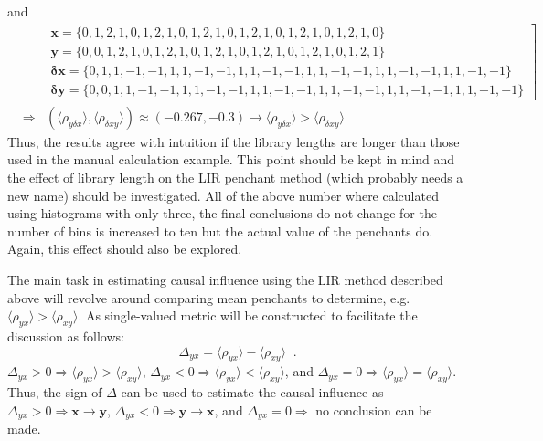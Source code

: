 \documentclass[a4paper,11pt]{article}
\begin{document}
and 
\begin{eqnarray}
& &\left.
\begin{array}{c}
\mathbf{x} = \{0,1,2,1,0,1,2,1,0,1,2,1,0,1,2,1,0,1,2,1,0,1,2,1,0\}\\
\mathbf{y} = \{0,0,1,2,1,0,1,2,1,0,1,2,1,0,1,2,1,0,1,2,1,0,1,2,1\}\\
\mathbf{\delta x} = \{0,1,1,-1,-1,1,1,-1,-1,1,1,-1,-1,1,1,-1,-1,1,1,-1,-1,1,1,-1,-1\}\\
\mathbf{\delta y} = \{0,0,1,1,-1,-1,1,1,-1,-1,1,1,-1,-1,1,1,-1,-1,1,1,-1,-1,1,1,-1,-1\}
\end{array}
\right] \\
&\Rightarrow& \left(\langle \rho_{y\delta x}\rangle, \langle \rho_{\delta xy}\rangle\right) \approx \left(-0.267
,-0.3\right) \rightarrow \langle \rho_{y\delta x}\rangle > \langle \rho_{\delta xy}\rangle
\end{eqnarray}
Thus, the results agree with intuition if the library lengths are longer than those used in the manual calculation example.  This point should be kept in mind and the effect of library length on the LIR penchant method (which probably needs a new name) should be investigated.  All of the above number where calculated using histograms with only three, the final conclusions do not change for the number of bins is increased to ten but the actual value of the penchants do.  Again, this effect should also be explored.

The main task in estimating causal influence using the LIR method described above will revolve around comparing mean penchants to determine, e.g.\ $\langle \rho_{yx}\rangle > \langle \rho_{xy}\rangle$.  As single-valued metric will be constructed to facilitate the discussion as follows:
$$
\Delta_{yx} = \langle \rho_{yx}\rangle - \langle \rho_{xy}\rangle\;\;.
$$
$\Delta_{yx} > 0\Rightarrow \langle \rho_{yx}\rangle > \langle \rho_{xy}\rangle$, $\Delta_{yx} < 0\Rightarrow \langle \rho_{yx}\rangle < \langle \rho_{xy}\rangle$, and $\Delta_{yx} = 0\Rightarrow \langle \rho_{yx}\rangle = \langle \rho_{xy}\rangle$.  Thus, the sign of $\Delta$ can be used to estimate the causal influence as $\Delta_{yx} > 0\Rightarrow \mathbf{x}\rightarrow\mathbf{y}$, $\Delta_{yx} < 0\Rightarrow \mathbf{y}\rightarrow\mathbf{x}$, and $\Delta_{yx} = 0\Rightarrow$ no conclusion can be made.
\end{document}
